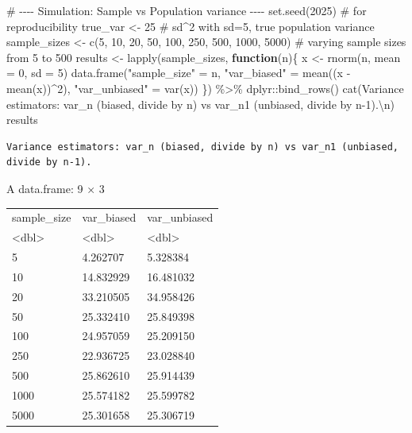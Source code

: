 \documentclass[
  12pt,
  a4paper,
]{scrbook}
\newenvironment{Shaded}{\begin{snugshade}}{\end{snugshade}}
\newcommand{\AttributeTok}[1]{\textcolor[rgb]{0.40,0.45,0.13}{#1}}
\newcommand{\CommentTok}[1]{\textcolor[rgb]{0.37,0.37,0.37}{#1}}
\newcommand{\ControlFlowTok}[1]{\textcolor[rgb]{0.00,0.23,0.31}{\textbf{#1}}}
\newcommand{\DecValTok}[1]{\textcolor[rgb]{0.68,0.00,0.00}{#1}}
\newcommand{\FunctionTok}[1]{\textcolor[rgb]{0.28,0.35,0.67}{#1}}
\newcommand{\NormalTok}[1]{\textcolor[rgb]{0.00,0.23,0.31}{#1}}
\newcommand{\OtherTok}[1]{\textcolor[rgb]{0.00,0.23,0.31}{#1}}
\newcommand{\SpecialCharTok}[1]{\textcolor[rgb]{0.37,0.37,0.37}{#1}}
\newcommand{\StringTok}[1]{\textcolor[rgb]{0.13,0.47,0.30}{#1}}
\theoremstyle{plain}
\theoremstyle{definition}
\theoremstyle{remark}
\begin{document}
\begin{Shaded}
\begin{Highlighting}[]
\CommentTok{\# {-}{-}{-}{-} Simulation: Sample vs Population variance {-}{-}{-}{-}}
\FunctionTok{set.seed}\NormalTok{(}\DecValTok{2025}\NormalTok{)  }\CommentTok{\# for reproducibility}
\NormalTok{true\_var }\OtherTok{\textless{}{-}} \DecValTok{25}  \CommentTok{\# sd\^{}2 with sd=5, true population variance}
\NormalTok{sample\_sizes }\OtherTok{\textless{}{-}} \FunctionTok{c}\NormalTok{(}\DecValTok{5}\NormalTok{, }\DecValTok{10}\NormalTok{, }\DecValTok{20}\NormalTok{, }\DecValTok{50}\NormalTok{, }\DecValTok{100}\NormalTok{, }\DecValTok{250}\NormalTok{, }\DecValTok{500}\NormalTok{, }\DecValTok{1000}\NormalTok{, }\DecValTok{5000}\NormalTok{) }\CommentTok{\# varying sample sizes from 5 to 500}
\NormalTok{results }\OtherTok{\textless{}{-}} \FunctionTok{lapply}\NormalTok{(sample\_sizes, }\ControlFlowTok{function}\NormalTok{(n)\{}
\NormalTok{  x }\OtherTok{\textless{}{-}} \FunctionTok{rnorm}\NormalTok{(n, }\AttributeTok{mean =} \DecValTok{0}\NormalTok{, }\AttributeTok{sd =} \DecValTok{5}\NormalTok{)}
  \FunctionTok{data.frame}\NormalTok{(}\StringTok{"sample\_size"} \OtherTok{=}\NormalTok{ n, }\StringTok{"var\_biased"} \OtherTok{=} \FunctionTok{mean}\NormalTok{((x }\SpecialCharTok{{-}} \FunctionTok{mean}\NormalTok{(x))}\SpecialCharTok{\^{}}\DecValTok{2}\NormalTok{), }\StringTok{"var\_unbiased"} \OtherTok{=} \FunctionTok{var}\NormalTok{(x))}
\NormalTok{\}) }\SpecialCharTok{\%\textgreater{}\%}\NormalTok{ dplyr}\SpecialCharTok{::}\FunctionTok{bind\_rows}\NormalTok{()}
\FunctionTok{cat}\NormalTok{(}\StringTok{\textquotesingle{}Variance estimators: var\_n (biased, divide by n) vs var\_n1 (unbiased, divide by n{-}1).}\SpecialCharTok{\textbackslash{}n}\StringTok{\textquotesingle{}}\NormalTok{)}
\NormalTok{results}
\end{Highlighting}
\end{Shaded}

\begin{verbatim}
Variance estimators: var_n (biased, divide by n) vs var_n1 (unbiased, divide by n-1).
\end{verbatim}

A data.frame: 9 × 3
\begin{tabular}{lll}
 sample\_size & var\_biased & var\_unbiased\\
 <dbl> & <dbl> & <dbl>\\
\hline
        5 &  4.262707 &  5.328384\\
       10 & 14.832929 & 16.481032\\
       20 & 33.210505 & 34.958426\\
       50 & 25.332410 & 25.849398\\
      100 & 24.957059 & 25.209150\\
      250 & 22.936725 & 23.028840\\
      500 & 25.862610 & 25.914439\\
     1000 & 25.574182 & 25.599782\\
     5000 & 25.301658 & 25.306719\\
\end{tabular}
\end{document}
